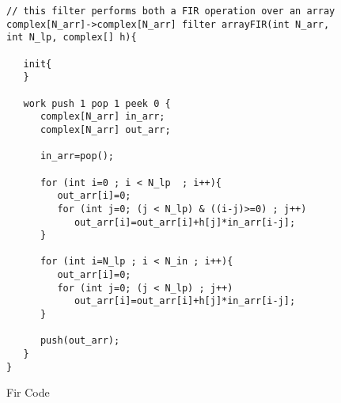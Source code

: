 \begin{figure}[t]
\begin{verbatim}
// this filter performs both a FIR operation over an array	    
complex[N_arr]->complex[N_arr] filter arrayFIR(int N_arr, int N_lp, complex[] h){

   init{
   }    

   work push 1 pop 1 peek 0 {
      complex[N_arr] in_arr;
      complex[N_arr] out_arr;

      in_arr=pop();

      for (int i=0 ; i < N_lp  ; i++){
         out_arr[i]=0;
         for (int j=0; (j < N_lp) & ((i-j)>=0) ; j++)
            out_arr[i]=out_arr[i]+h[j]*in_arr[i-j];
      }
		
      for (int i=N_lp ; i < N_in ; i++){
         out_arr[i]=0;
         for (int j=0; (j < N_lp) ; j++)
            out_arr[i]=out_arr[i]+h[j]*in_arr[i-j];
      }

      push(out_arr);
   }
}
\end{verbatim}
\caption{Fir Code
\protect\label{fig:fir}}
\end{figure}